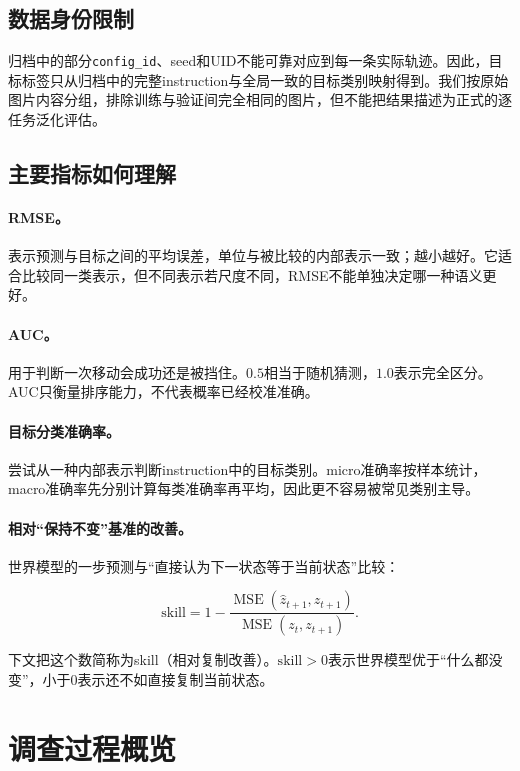 \documentclass[UTF8,11pt,a4paper,fontset=none]{ctexart}
\newcommand{\code}[1]{\texttt{#1}}
\begin{document}
\subsection{数据身份限制}

归档中的部分\code{config\_id}、seed和UID不能可靠对应到每一条实际轨迹。因此，目标标签只从归档中的完整instruction与全局一致的目标类别映射得到。我们按原始图片内容分组，排除训练与验证间完全相同的图片，但不能把结果描述为正式的逐任务泛化评估。

\subsection{主要指标如何理解}

\paragraph{RMSE。}
表示预测与目标之间的平均误差，单位与被比较的内部表示一致；越小越好。它适合比较同一类表示，但不同表示若尺度不同，RMSE不能单独决定哪一种语义更好。

\paragraph{AUC。}
用于判断一次移动会成功还是被挡住。$0.5$相当于随机猜测，$1.0$表示完全区分。AUC只衡量排序能力，不代表概率已经校准准确。

\paragraph{目标分类准确率。}
尝试从一种内部表示判断instruction中的目标类别。micro准确率按样本统计，macro准确率先分别计算每类准确率再平均，因此更不容易被常见类别主导。

\paragraph{相对“保持不变”基准的改善。}
世界模型的一步预测与“直接认为下一状态等于当前状态”比较：

\begin{equation}
  \mathrm{skill}=1-
  \frac{\operatorname{MSE}(\hat z_{t+1},z_{t+1})}
       {\operatorname{MSE}(z_t,z_{t+1})}.
\end{equation}

下文把这个数简称为skill（相对复制改善）。$\mathrm{skill}>0$表示世界模型优于“什么都没变”，小于0表示还不如直接复制当前状态。

\section{调查过程概览}
\end{document}
